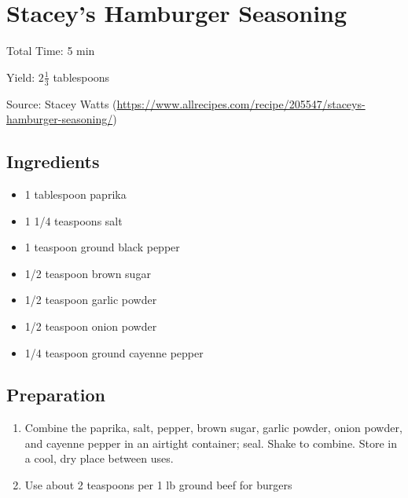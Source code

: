 \section{Stacey's Hamburger Seasoning}

\begin{center}
Total Time: 5 min

\noindent Yield: $2\frac{1}{3}$ tablespoons

\vspace{1em}

    Source: Stacey Watts (\url{https://www.allrecipes.com/recipe/205547/staceys-hamburger-seasoning/})
\end{center}

\subsection{Ingredients}
\begin{multicols}{2}
\begin{itemize}
    \item 1 tablespoon paprika
    \item 1 1/4 teaspoons salt
    \item 1 teaspoon ground black pepper
    \item 1/2 teaspoon brown sugar
    \item 1/2 teaspoon garlic powder
    \item 1/2 teaspoon onion powder
    \item 1/4 teaspoon ground cayenne pepper
\end{itemize}
\end{multicols}

\subsection{Preparation}
\begin{enumerate}
    \item Combine the paprika, salt, pepper, brown sugar, garlic powder, onion powder, and cayenne pepper in an airtight container; seal. Shake to combine. Store in a cool, dry place between uses.
    \item Use about 2 teaspoons per 1 lb ground beef for burgers
\end{enumerate}

